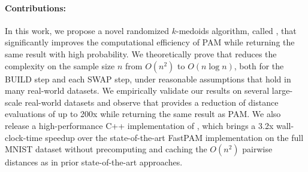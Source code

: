 



\paragraph{Contributions:} 
In this work, we propose a novel randomized $k$-medoids algorithm, called \algnamenospace, that significantly improves the computational efficiency of PAM while returning the same result with high probability.
We theoretically prove that \algname reduces the complexity on the sample size $n$ from $O(n^2)$ to $O(n\log n)$, both for the BUILD step and each SWAP step, under reasonable assumptions that hold in many real-world datasets.
We empirically validate our results on several large-scale real-world datasets
and observe that \algname provides a reduction of distance evaluations of up to 200x while returning the same result as PAM.
We also release a high-performance C++ implementation of \algnamenospace, which brings a 3.2x wall-clock-time speedup over the state-of-the-art FastPAM implementation \cite{schubert2019elki} on the full MNIST dataset without precomputing and caching the $O(n^2)$ pairwise distances as in prior state-of-the-art approaches.

